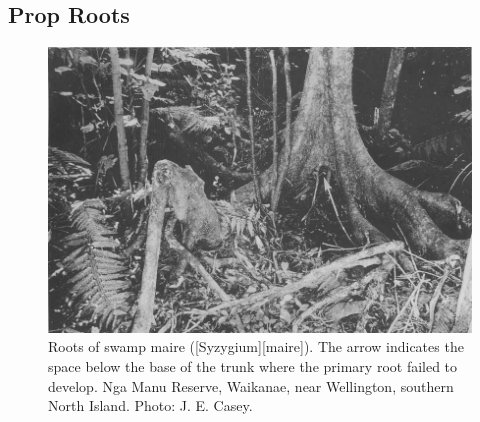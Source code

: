 \subsection{Prop Roots}

\begin{figure}[htb]
	\centering
	\begin{minipage}[t]{0.678\textwidth}
		\centering
		\includegraphics[width=\textwidth]{graphics/figure14swampmaire.jpg}
    	\caption[Roots of swamp maire]{Roots of swamp maire ([Syzygium][maire]).
    	The arrow indicates the space below the base of the trunk where the primary root failed to develop.
    	Nga Manu Reserve, Waikanae, near Wellington, southern North Island.
    	Photo:  J. E. Casey.}%
    	\label{fig:14swampmaire}
	\end{minipage}\hfill%
	\begin{minipage}[t]{0.302\textwidth}
    	\centering

\end{minipage}
\end{figure}
